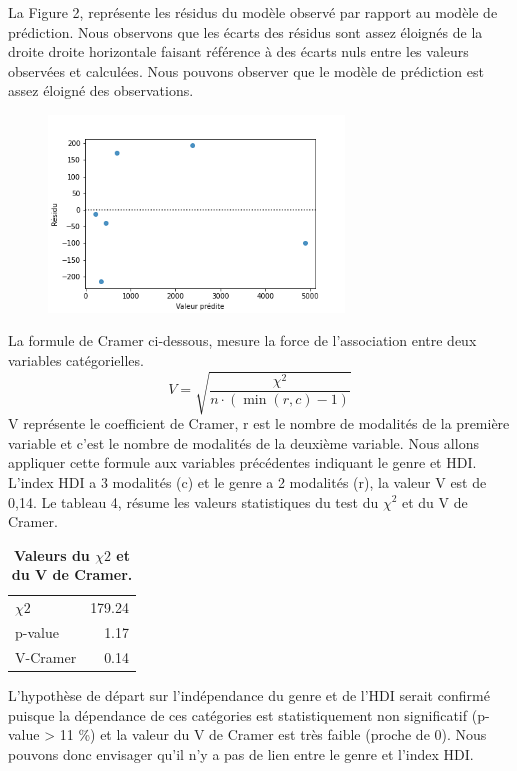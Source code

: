 \documentclass[12pt, a4paper, titlepage, table]{article}
\begin{document}
La Figure 2, représente les résidus du modèle observé par rapport au modèle de prédiction. Nous observons que les écarts des résidus sont assez éloignés 
de la droite droite horizontale faisant référence à des écarts nuls entre les valeurs observées et calculées. Nous pouvons observer que le modèle de 
prédiction est assez éloigné des observations.

	\begin{figure}[H]
		\centering
		\includegraphics[width=0.7\textwidth]{../../graph/residus_chi2.png}
	\end{figure}


La formule de Cramer ci-dessous, mesure la force de l'association entre deux variables catégorielles.
\[ V = \sqrt{\frac{\chi^2}{n \cdot (\min(r, c) - 1)}} \]
V représente le coefficient de Cramer,  r est le nombre de modalités de la première variable et c'est le nombre de modalités de la deuxième variable.
Nous allons appliquer cette formule aux variables précédentes indiquant le genre et HDI.
L'index HDI a 3 modalités (c) et le genre a 2 modalités (r), la valeur V est de 0,14.
Le tableau 4, résume les valeurs statistiques du test du $\chi^2$ et du V de Cramer.

\begin{table}[H]
	\centering
	\fontsize{12}{20}\selectfont
	\begin{tabular}{|l|r|}
		\hline  
		$\chi2$&	179.24\\
		p-value&	1.17\\
		V-Cramer&	0.14\\
		\hline
	\end{tabular}
	\caption{\textbf{Valeurs du $\chi2$ et du V de Cramer.}}
\end{table}

L'hypothèse de départ sur l'indépendance du genre et de l'HDI serait confirmé puisque la dépendance de ces catégories est statistiquement non significatif 
(p-value > 11 \%) et la valeur du V de Cramer est très faible (proche de 0). Nous pouvons donc envisager qu'il n'y a pas de lien entre le genre et l'index HDI.
\end{document}
